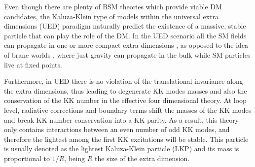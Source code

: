Even though there are plenty of BSM theories which provide viable DM candidates, the Kaluza-Klein type of models \cite{Kaluza1921, Klein1926} within the universal extra dimensions (UED) paradigm naturally predict the existence of a massive, stable particle that can play the role of the DM. In the UED scenario all the SM fields can propagate in one or more compact extra dimensions \cite{Appelquist2000}, as opposed to the idea of brane worlds \cite{Arkani-Hamed1998, Randall1999}, where just gravity can propagate in the bulk while SM particles live at fixed points.

Furthermore, in UED there is no violation of the translational invariance along the extra dimensions, thus leading to degenerate KK modes masses  and also the conservation of the KK number in the effective four dimensional theory. At loop level, radiative corrections and boundary terms shift the masses of the KK modes and break KK number conservation into a KK parity. As a result, this theory only contains interactions between an even number of odd KK modes, and therefore the lightest among the first KK excitations will be stable. This particle is usually denoted as the lightest Kaluza-Klein particle (LKP) and its mass is proportional to $1/R$, being $R$ the size of the extra dimension.

